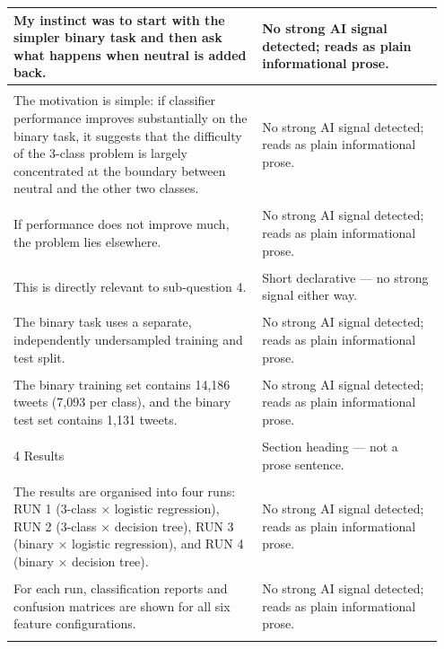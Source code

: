 \documentclass[11pt]{article}
\begin{document}
\begin{longtable}{|p{0.55\linewidth}|p{0.40\linewidth}|}
\hline
My instinct was to start with the simpler binary task and then ask what happens when neutral is added back. & No strong AI signal detected; reads as plain informational prose. \\[2pt]
\hline
\rule{0pt}{3.5cm} & \\
\hline
The motivation is simple: if classifier performance improves substantially on the binary task, it suggests that the difficulty of the 3-class problem is largely concentrated at the boundary between neutral and the other two classes. & No strong AI signal detected; reads as plain informational prose. \\[2pt]
\hline
\rule{0pt}{3.5cm} & \\
\hline
If performance does not improve much, the problem lies elsewhere. & No strong AI signal detected; reads as plain informational prose. \\[2pt]
\hline
\rule{0pt}{3.5cm} & \\
\hline
This is directly relevant to sub-question 4. & Short declarative --- no strong signal either way. \\[2pt]
\hline
\rule{0pt}{3.5cm} & \\
\hline
The binary task uses a separate, independently undersampled training and test split. & No strong AI signal detected; reads as plain informational prose. \\[2pt]
\hline
\rule{0pt}{3.5cm} & \\
\hline
The binary training set contains 14,186 tweets (7,093 per class), and the binary test set contains 1,131 tweets. & No strong AI signal detected; reads as plain informational prose. \\[2pt]
\hline
\rule{0pt}{3.5cm} & \\
\hline
4 Results & Section heading --- not a prose sentence. \\[2pt]
\hline
\rule{0pt}{3.5cm} & \\
\hline
The results are organised into four runs: RUN 1 (3-class × logistic regression), RUN 2 (3-class × decision tree), RUN 3 (binary × logistic regression), and RUN 4 (binary × decision tree). & No strong AI signal detected; reads as plain informational prose. \\[2pt]
\hline
\rule{0pt}{3.5cm} & \\
\hline
For each run, classification reports and confusion matrices are shown for all six feature configurations. & No strong AI signal detected; reads as plain informational prose. \\[2pt]
\hline
\rule{0pt}{3.5cm} & \\

\end{longtable}
\end{document}

